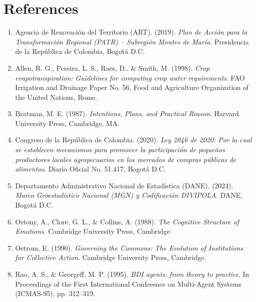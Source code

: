 \documentclass[11pt,a4paper]{article}
\begin{document}
\section{References}
\begin{enumerate}[leftmargin=*]
    \item Agencia de Renovaci\'on del Territorio (ART). (2019). \textit{Plan de Acci\'on para la Transformaci\'on Regional (PATR) -- Subregi\'on Montes de Mar\'ia}. Presidencia de la Rep\'ublica de Colombia, Bogot\'a D.C.
    \item Allen, R. G., Pereira, L. S., Raes, D., \& Smith, M. (1998). \textit{Crop evapotranspiration: Guidelines for computing crop water requirements}. FAO Irrigation and Drainage Paper No. 56, Food and Agriculture Organization of the United Nations, Rome.
    \item Bratman, M. E. (1987). \textit{Intentions, Plans, and Practical Reason}. Harvard University Press, Cambridge, MA.
    \item Congreso de la Rep\'ublica de Colombia. (2020). \textit{Ley 2046 de 2020: Por la cual se establecen mecanismos para promover la participaci\'on de peque\~nos productores locales agropecuarios en los mercados de compras p\'ublicas de alimentos}. Diario Oficial No. 51.417, Bogot\'a D.C.
    \item Departamento Administrativo Nacional de Estad\'istica (DANE). (2024). \textit{Marco Geoestad\'istico Nacional (MGN) y Codificaci\'on DIVIPOLA}. DANE, Bogot\'a D.C.
    \item Ortony, A., Clore, G. L., \& Collins, A. (1988). \textit{The Cognitive Structure of Emotions}. Cambridge University Press, Cambridge.
    \item Ostrom, E. (1990). \textit{Governing the Commons: The Evolution of Institutions for Collective Action}. Cambridge University Press, Cambridge.
    \item Rao, A. S., \& Georgeff, M. P. (1995). \textit{BDI agents: from theory to practice}. In Proceedings of the First International Conference on Multi-Agent Systems (ICMAS-95), pp. 312--319.
\end{enumerate}
\end{document}
